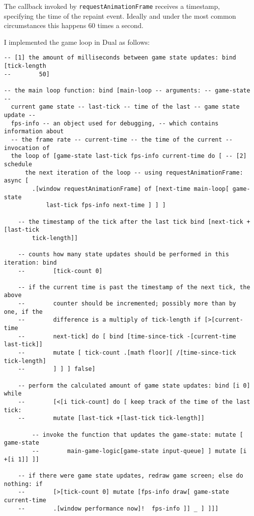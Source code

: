 The callback invoked by \texttt{requestAnimationFrame} receives a timestamp,
specifying the time of the repaint event. Ideally and under the most common
circumstances this happens 60 times a second.

I implemented the game loop in Dual as follows:
\begin{lstlisting}
-- [1] the amount of milliseconds between game state updates: bind [tick-length
--        50]

-- the main loop function: bind [main-loop -- arguments: -- game-state --
  current game state -- last-tick -- time of the last -- game state update --
  fps-info -- an object used for debugging, -- which contains information about
  -- the frame rate -- current-time -- the time of the current -- invocation of
  the loop of [game-state last-tick fps-info current-time do [ -- [2] schedule
      the next iteration of the loop -- using requestAnimationFrame: async [
        .[window requestAnimationFrame] of [next-time main-loop[ game-state
            last-tick fps-info next-time ] ] ]
    
    -- the timestamp of the tick after the last tick bind [next-tick +[last-tick
        tick-length]]
    
    -- counts how many state updates should be performed in this iteration: bind
    --        [tick-count 0]
    
    -- if the current time is past the timestamp of the next tick, the above
    --        counter should be incremented; possibly more than by one, if the
    --        difference is a multiply of tick-length if [>[current-time
    --        next-tick] do [ bind [time-since-tick -[current-time last-tick]]
    --        mutate [ tick-count .[math floor][ /[time-since-tick tick-length]
    --        ] ] ] false]
    
    -- perform the calculated amount of game state updates: bind [i 0] while
    --        [<[i tick-count] do [ keep track of the time of the last tick:
    --        mutate [last-tick +[last-tick tick-length]]
        
        -- invoke the function that updates the game-state: mutate [ game-state
        --        main-game-logic[game-state input-queue] ] mutate [i +[i 1]] ]]

    -- if there were game state updates, redraw game screen; else do nothing: if
    --        [>[tick-count 0] mutate [fps-info draw[ game-state current-time
    --        .[window performance now]!  fps-info ]] _ ] ]]]
\end{lstlisting}


